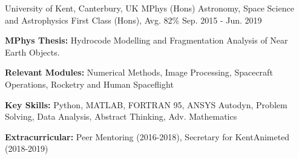 

\begin{cventries}


  \cventry
    {University of Kent, Canterbury, UK} %
    {MPhys (Hons) Astronomy, Space Science and Astrophysics} %
    {First Class (Hons), Avg. 82\%} %
    {Sep. 2015 - Jun. 2019} %
    {
      \begin{cvitems} %
         \item {\textbf{MPhys Thesis:} Hydrocode Modelling and Fragmentation Analysis of Near Earth Objects.}
         \item {\textbf{Relevant Modules:} Numerical Methods, Image Processing, Spacecraft Operations, Rocketry and Human Spaceflight}
         \item {\textbf{Key Skills:} Python, MATLAB, FORTRAN 95, ANSYS Autodyn, Problem Solving, Data Analysis, Abstract Thinking, Adv. Mathematics}
         \item {\textbf{Extracurricular:} Peer Mentoring (2016-2018), Secretary for KentAnimeted (2018-2019)}
      \end{cvitems}
    }

\end{cventries}

